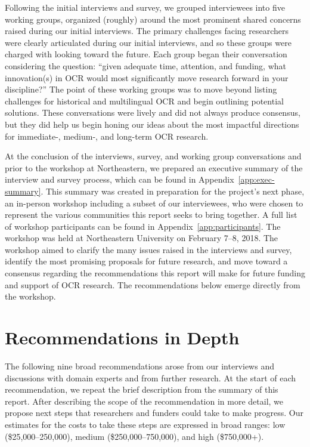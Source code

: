 \documentclass[twoside,11pt]{report}
\begin{document}
Following the initial interviews and survey, we grouped interviewees into five working groups, organized (roughly) around the most prominent shared concerns raised during our initial interviews. The primary challenges facing researchers were clearly articulated during our initial interviews, and so these groups were charged with looking toward the future. Each group began their conversation considering the question: ``given adequate time, attention, and funding, what innovation(s) in OCR would most significantly move research forward in your discipline?''  The point of these working groups was to move beyond listing challenges for historical and multilingual OCR and begin outlining potential solutions. These conversations were lively and did not always produce consensus, but they did help us begin honing our ideas about the most impactful directions for immediate-, medium-, and long-term OCR research.

At the conclusion of the interviews, survey, and working group conversations and prior to the workshop at Northeastern, we prepared an executive summary of the interview and survey process, which can be found in Appendix~\ref{app:exec-summary}. This summary was created in preparation for the project's next phase, an in-person workshop including a subset of our interviewees, who were chosen to represent the various communities this report seeks to bring together. A full list of workshop participants can be found in Appendix~\ref{app:participants}.  The workshop was held at Northeastern University on February 7--8, 2018. The workshop aimed to clarify the many issues raised in the interviews and survey, identify the most promising proposals for future research, and move toward a consensus regarding the recommendations this report will make for future funding and support of OCR research. The recommendations below emerge directly from the workshop.

\newpage

\section{Recommendations in Depth}

The following nine broad recommendations arose from our interviews and discussions with domain experts and from further research. At the start of each recommendation, we repeat the brief description from the summary of this report. After describing the scope of the recommendation in more detail, we propose next steps that researchers and funders could take to make progress. Our estimates for the costs to take these steps are expressed in broad ranges: low (\$25,000--250,000), medium (\$250,000--750,000), and high (\$750,000+).
\end{document}

